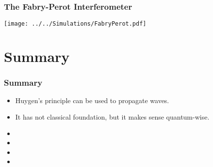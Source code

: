 \documentclass[pdf, hideothersubsections]{beamer}
\begin{document}
\begin{frame}
\frametitle{The Fabry-Perot Interferometer}

\centering
\texttt{[image: ../../Simulations/FabryPerot.pdf]}

\end{frame}

\section{Summary}
\begin{frame}
\frametitle{Summary}
\begin{itemize}
  \item Huygen's principle can be used to propagate waves.
  \item It has not classical foundation, but it makes sense quantum-wise.
  \item 

  \item 
  \item 

  \item 

\end{itemize}
\end{frame}
\end{document}
